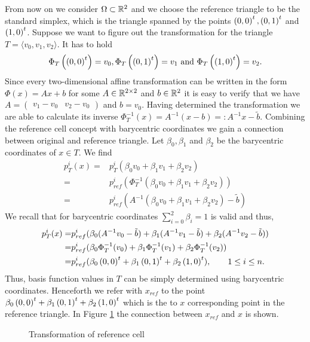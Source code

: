 \begin{example}\label{ex: base cell trafo}
From now on we consider $\Omega \subset \mathbb{R}^2$ and we choose the reference triangle to be the standard simplex, which is the triangle spanned by the points $\left( 0, 0\right)^t, \left( 0, 1\right)^t$ and $\left( 1, 0\right)^t$.
Suppose we want to figure out the transformation for the triangle $T = \langle v_0,v_1,v_2 \rangle$.
It has to hold
\[
\Phi_T\left(\left( 0, 0\right)^t\right) = v_0, \Phi_T\left(\left( 0, 1\right)^t\right) = v_1 \textnormal{ and } \Phi_T\left(\left( 1, 0\right)^t\right) = v_2.
\]
Since every two-dimensional affine transformation can be written in the form $\Phi(x) = Ax+b$ for some $A \in \mathbb{R}^{2 \times 2}$ and $b \in \mathbb{R}^2$ it is easy to verify that we have $A = \begin{pmatrix} v_1-v_0 & v_2-v_0\end{pmatrix}$ and $b = v_0$.
Having determined the transformation we are able to calculate its inverse $\Phi_T^{-1}(x) = A^{-1} (x-b) =: A^{-1} x- \tilde b$.
Combining the reference cell concept with barycentric coordinates we gain a connection between original and reference triangle. Let $\beta_0, \beta_1$ and $\beta_2$ be the barycentric coordinates of $x \in T$. We find
\begin{align*}
	p^i_T(x) =& p_T^i( \beta_0 v_0 +\beta_1 v_1 + \beta_2 v_2  ) \\
	=& p^i_{ref}(\Phi_T^{-1}(\beta_0 v_0 +\beta_1 v_1 + \beta_2 v_2)) \\
	=& p^i_{ref}(A^{-1}(\beta_0 v_0 +\beta_1 v_1 + \beta_2 v_2)- \tilde b)
\end{align*}
We recall that for barycentric coordinates $\sum_{i=0}^2 \beta_i = 1$ is valid and thus,
\begin{align*}
	p^i_T(x)
	=& p^i_{ref}(\beta_0(A^{-1}v_0 -\tilde b) +\beta_1(A^{-1}v_1 -\tilde b) + \beta_2(A^{-1}v_2 -\tilde b))\\
	=& p^i_{ref}(\beta_0 \Phi_T^{-1}(v_0) +\beta_1 \Phi_T^{-1}(v_1) + \beta_2 \Phi_T^{-1}(v_2)) \\
	=& p^i_{ref}(\beta_0 \left( 0, 0\right)^t +\beta_1 \left( 0, 1\right)^t + \beta_2 \left( 1, 0\right)^t ), \qquad 1 \leq i \leq n.
\end{align*}
Thus, basis function values in $T$ can be simply determined using barycentric coordinates. Henceforth we refer with $x_{ref}$  to the point $\beta_0 \left( 0, 0\right)^t +\beta_1 \left( 0, 1\right)^t + \beta_2 \left( 1, 0\right)^t$ which is the to $x$ corresponding point in the reference triangle. In Figure \ref{fig: transformation} the connection between $x_{ref}$ and $x$ is shown.

\begin{figure}[H]
	
	\caption{Transformation of reference cell}
	 \label{fig: transformation}
\end{figure}


\end{example}
